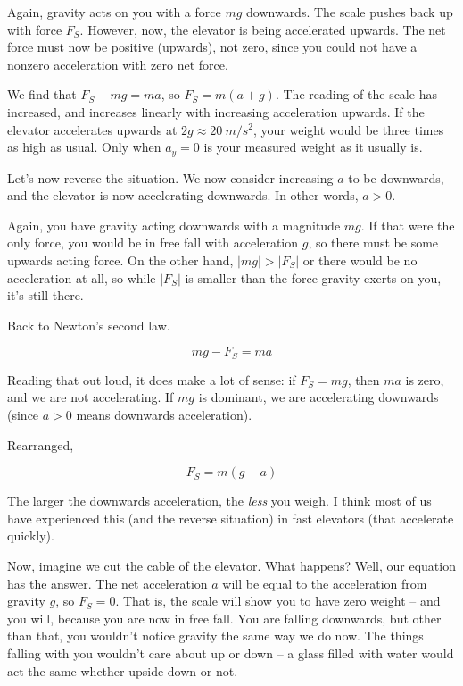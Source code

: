 \documentclass[8.01x]{subfiles}
\begin{document}
Again, gravity acts on you with a force $m g$ downwards. The scale pushes back up with force $F_S$. However, now, the elevator is being accelerated upwards. The net force must now be positive (upwards), not zero, since you could not have a nonzero acceleration with zero net force.

We find that $F_S - m g = m a$, so $F_S = m(a + g)$. The reading of the scale has increased, and increases linearly with increasing acceleration upwards. If the elevator accelerates upwards at $2g \approx \SI{20}{m/s^2}$, your weight would be three times as high as usual. Only when $a_y = 0$ is your measured weight as it usually is.

Let's now reverse the situation. We now consider increasing $a$ to be downwards, and the elevator is now accelerating downwards. In other words, $a > 0$.

Again, you have gravity acting downwards with a magnitude $m g$. If that were the only force, you would be in free fall with acceleration $g$, so there must be some upwards acting force. On the other hand, $|m g| > |F_S|$ or there would be no acceleration at all, so while $|F_S|$ is smaller than the force gravity exerts on you, it's still there.

Back to Newton's second law.

\begin{equation}
m g - F_S = m a
\end{equation}

Reading that out loud, it does make a lot of sense: if $F_S = m g$, then $m a$ is zero, and we are not accelerating. If $m g$ is dominant, we are accelerating downwards (since $a > 0$ means downwards acceleration).

Rearranged,

\begin{equation}
F_S = m(g - a)
\end{equation}

The larger the downwards acceleration, the \emph{less} you weigh. I think most of us have experienced this (and the reverse situation) in fast elevators (that accelerate quickly).

Now, imagine we cut the cable of the elevator. What happens? Well, our equation has the answer. The net acceleration $a$ will be equal to the acceleration from gravity $g$, so $F_S = 0$. That is, the scale will show you to have zero weight -- and you will, because you are now in free fall. You are falling downwards, but other than that, you wouldn't notice gravity the same way we do now. The things falling with you wouldn't care about up or down -- a glass filled with water would act the same whether upside down or not.
\end{document}
